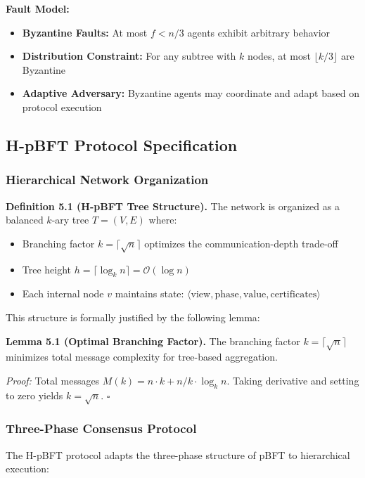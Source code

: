 \documentclass[conference]{IEEEtran}
\newcommand{\bigO}{\mathcal{O}}
\begin{document}
\textbf{Fault Model:}
\begin{itemize}
    \item \textbf{Byzantine Faults:} At most $f < n/3$ agents exhibit arbitrary behavior
    \item \textbf{Distribution Constraint:} For any subtree with $k$ nodes, at most $\lfloor k/3 \rfloor$ are Byzantine
    \item \textbf{Adaptive Adversary:} Byzantine agents may coordinate and adapt based on protocol execution
\end{itemize}

\subsection{H-pBFT Protocol Specification}

\subsubsection{Hierarchical Network Organization}

\textbf{Definition 5.1 (H-pBFT Tree Structure).} The network is organized as a balanced $k$-ary tree $T = (V, E)$ where:
\begin{itemize}
    \item Branching factor $k = \lceil \sqrt{n} \rceil$ optimizes the communication-depth trade-off
    \item Tree height $h = \lceil \log_k n \rceil = \bigO(\log n)$
    \item Each internal node $v$ maintains state: $\langle \text{view}, \text{phase}, \text{value}, \text{certificates} \rangle$
\end{itemize}

This structure is formally justified by the following lemma:

\textbf{Lemma 5.1 (Optimal Branching Factor).} The branching factor $k = \lceil \sqrt{n} \rceil$ minimizes total message complexity for tree-based aggregation.

\textit{Proof:} Total messages $M(k) = n \cdot k + n/k \cdot \log_k n$. Taking derivative and setting to zero yields $k = \sqrt{n}$. $\square$

\subsubsection{Three-Phase Consensus Protocol}

The H-pBFT protocol adapts the three-phase structure of pBFT to hierarchical execution:
\end{document}
